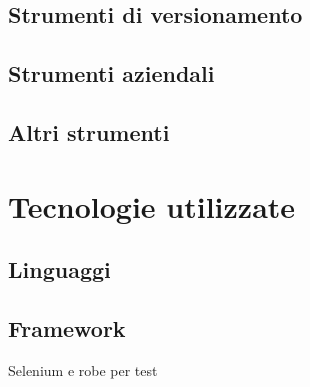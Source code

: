 \subsection{Strumenti di versionamento}

\subsection{Strumenti aziendali}

\subsection{Altri strumenti}

\section{Tecnologie utilizzate}

\subsection{Linguaggi}

\subsection{Framework}
Selenium e robe per test 

